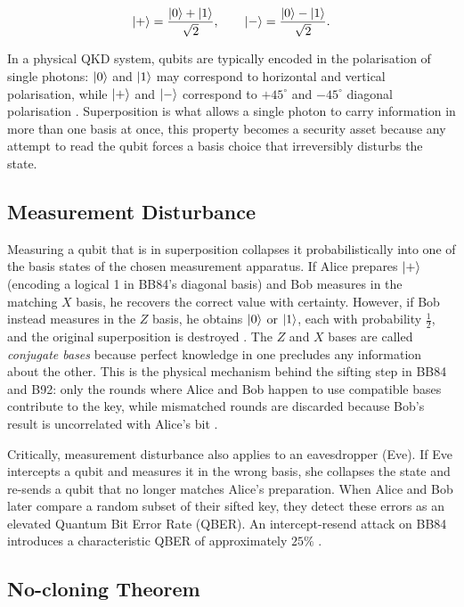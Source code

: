 \documentclass[10pt, a4paper]{report}
\begin{document}
%
\begin{equation}
\label{eq:diag-basis}
\ket{+} = \frac{\ket{0}+\ket{1}}{\sqrt{2}}, \qquad
\ket{-} = \frac{\ket{0}-\ket{1}}{\sqrt{2}}.
\end{equation}
%

In a physical QKD system, qubits are typically encoded in the polarisation of single photons: $\ket{0}$ and $\ket{1}$ may correspond to horizontal and vertical polarisation, while $\ket{+}$ and $\ket{-}$ correspond to $+45^{\circ}$ and $-45^{\circ}$ diagonal polarisation \cite{BB84}. Superposition is what allows a single photon to carry information in more than one basis at once, this property becomes a security asset because any attempt to read the qubit forces a basis choice that irreversibly disturbs the state.

\subsection{Measurement Disturbance}
Measuring a qubit that is in superposition collapses it probabilistically into one of the basis states of the chosen measurement apparatus. If Alice prepares $\ket{+}$ (encoding a logical 1 in BB84's diagonal basis) and Bob measures in the matching $X$ basis, he recovers the correct value with certainty. However, if Bob instead measures in the $Z$ basis, he obtains $\ket{0}$ or $\ket{1}$, each with probability $\frac{1}{2}$, and the original superposition is destroyed \cite{QKDbible}. The $Z$ and $X$ bases are called \textit{conjugate bases} because perfect knowledge in one precludes any information about the other. This is the physical mechanism behind the sifting step in BB84 and B92: only the rounds where Alice and Bob happen to use compatible bases contribute to the key, while mismatched rounds are discarded because Bob's result is uncorrelated with Alice's bit \cite{BB84, B92}.

Critically, measurement disturbance also applies to an eavesdropper (Eve). If Eve intercepts a qubit and measures it in the wrong basis, she collapses the state and re-sends a qubit that no longer matches Alice's preparation. When Alice and Bob later compare a random subset of their sifted key, they detect these errors as an elevated Quantum Bit Error Rate (QBER). An intercept-resend attack on BB84 introduces a characteristic QBER of approximately $25\%$ \cite{Scarani2009, ShorPreskill2000}. %


\subsection{No-cloning Theorem}
\end{document}
